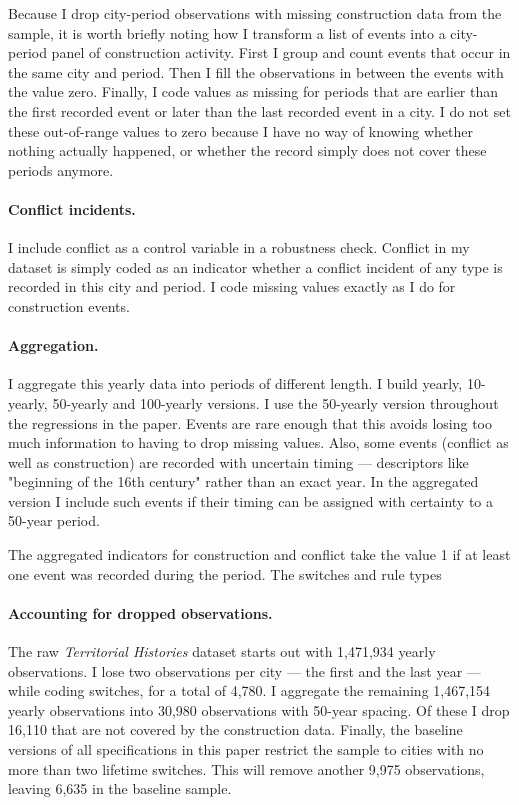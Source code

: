 \documentclass[11pt, a4paper]{article}
\begin{document}
Because I drop city-period observations with missing construction data from the sample, it is worth briefly noting how I transform a list of events into a city-period panel of construction activity. First I group and count events that occur in the same city and period. Then I fill the observations in between the events with the value zero. Finally, I code values as missing for periods that are earlier than the first recorded event or later than the last recorded event in a city. I do not set these out-of-range values to zero because I have no way of knowing whether nothing actually happened, or whether the record simply does not cover these periods anymore.


\paragraph{Conflict incidents.}

I include conflict as a control variable in a robustness check. Conflict in my dataset is simply coded as an indicator whether a conflict incident of any type is recorded in this city and period. I code missing values exactly as I do for construction events. 


\paragraph{Aggregation.}

I aggregate this yearly data into periods of different length. I build yearly, 10-yearly, 50-yearly and 100-yearly versions. I use the 50-yearly version throughout the regressions in the paper. Events are rare enough that this avoids losing too much information to having to drop missing values. Also, some events (conflict as well as construction) are recorded with uncertain timing --- descriptors like "beginning of the 16th century" rather than an exact year. In the aggregated version I include such events if their timing can be assigned with certainty to a 50-year period.

The aggregated indicators for construction and conflict take the value 1 if at least one event was recorded during the period. The switches and rule types

\paragraph{Accounting for dropped observations.}

The raw \textit{Territorial Histories} dataset starts out with 1,471,934 yearly observations. I lose two observations per city --- the first and the last year --- while coding switches, for a total of 4,780. I aggregate the remaining 1,467,154 yearly observations into 30,980 observations with 50-year spacing. Of these I drop 16,110 that are not covered by the construction data. Finally, the baseline versions of all specifications in this paper restrict the sample to cities with no more than two lifetime switches. This will remove another 9,975 observations, leaving 6,635 in the baseline sample.
\end{document}
